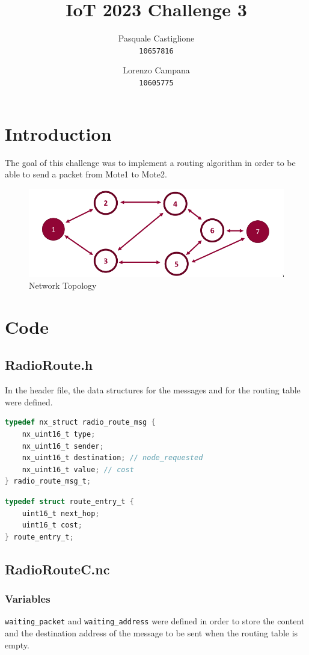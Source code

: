 \documentclass[11pt]{article}
\title{\textbf{IoT 2023 Challenge 3}}
\author{
  Pasquale Castiglione\\
	\texttt{10657816}
  \and
  Lorenzo Campana\\
  \texttt{10605775}
}
\date{}
\begin{document}
\maketitle

\section*{Introduction}
The goal of this challenge was to implement a routing algorithm in order to be able to send a packet from Mote1 to Mote2.
\begin{figure}[h]
\includegraphics[width=\textwidth]{topology.png}
\caption{Network Topology}
\end{figure}
\section*{Code}
\subsection*{RadioRoute.h}
In the header file, the data structures for the messages and for the routing table were defined.
\begin{lstlisting}[language=C,basicstyle=\footnotesize]
typedef nx_struct radio_route_msg {
	nx_uint16_t type;
	nx_uint16_t sender;
	nx_uint16_t destination; // node_requested
	nx_uint16_t value; // cost
} radio_route_msg_t;
\end{lstlisting}

\begin{lstlisting}[language=C,basicstyle=\footnotesize]
typedef struct route_entry_t {
	uint16_t next_hop;
  	uint16_t cost;
} route_entry_t;
\end{lstlisting}

\subsection*{RadioRouteC.nc}
\subsubsection*{Variables} 
\texttt{waiting\_packet} and \texttt{waiting\_address} were defined in order to store the content and the destination address of the message to be sent when the routing table is empty.
\end{document}
